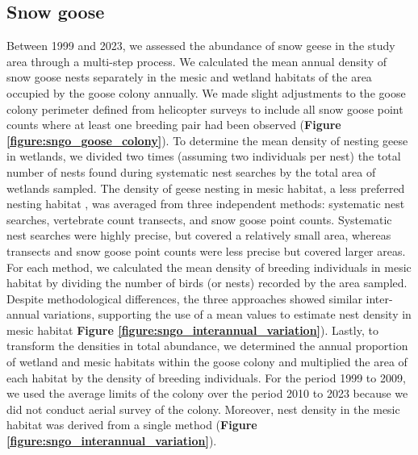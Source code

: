 \documentclass[a4paper,twoside,10pt]{article}
\begin{document}
\subsection{Snow goose}
Between 1999 and 2023, we assessed the abundance of snow geese in the study area through a multi-step process. We calculated the mean annual density of snow goose nests separately in the mesic and wetland habitats of the area occupied by the goose colony annually. We made slight adjustments to the goose colony perimeter defined from helicopter surveys to include all snow goose point counts where at least one breeding pair had been observed (\textbf{Figure \ref{figure:sngo_goose_colony}}). To determine the mean density of nesting geese in wetlands, we divided two times (assuming two individuals per nest) the total number of nests found during systematic nest searches by the total area of wetlands sampled. The density of geese nesting in mesic habitat, a less preferred nesting habitat \citep{lecomte2008}, was averaged from three independent methods: systematic nest searches, vertebrate count transects, and snow goose point counts. Systematic nest searches were highly precise, but covered a relatively small area, whereas transects and snow goose point counts were less precise but covered larger areas. For each method, we calculated the mean density of breeding individuals in mesic habitat by dividing the number of birds (or nests) recorded by the area sampled. Despite methodological differences, the three approaches showed similar inter-annual variations, supporting the use of a mean values to estimate nest density in mesic habitat \textbf{Figure \ref{figure:sngo_interannual_variation}}). Lastly, to transform the densities in total abundance, we determined the annual proportion of wetland and mesic habitats within the goose colony and multiplied the area of each habitat by the density of breeding individuals. For the period 1999 to 2009, we used the average limits of the colony over the period 2010 to 2023 because we did not conduct aerial survey of the colony. Moreover, nest density in the mesic habitat was derived from a single method (\textbf{Figure \ref{figure:sngo_interannual_variation}}). 
\end{document}
